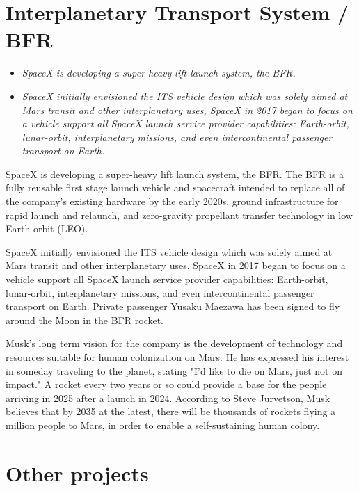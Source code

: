 \section{Interplanetary Transport System /
BFR}\label{interplanetary-transport-system-bfr}

\begin{itemize}
\item
  \emph{SpaceX is developing a super-heavy lift launch system, the BFR.}
\item
  \emph{SpaceX initially envisioned the ITS vehicle design which was
  solely aimed at Mars transit and other interplanetary uses, SpaceX in
  2017 began to focus on a vehicle support all SpaceX launch service
  provider capabilities: Earth-orbit, lunar-orbit, interplanetary
  missions, and even intercontinental passenger transport on Earth.}
\end{itemize}

SpaceX is developing a super-heavy lift launch system, the BFR. The BFR
is a fully reusable first stage launch vehicle and spacecraft intended
to replace all of the company's existing hardware by the early 2020s,
ground infrastructure for rapid launch and relaunch, and zero-gravity
propellant transfer technology in low Earth orbit (LEO).

SpaceX initially envisioned the ITS vehicle design which was solely
aimed at Mars transit and other interplanetary uses, SpaceX in 2017
began to focus on a vehicle support all SpaceX launch service provider
capabilities: Earth-orbit, lunar-orbit, interplanetary missions, and
even intercontinental passenger transport on Earth. Private passenger
Yusaku Maezawa has been signed to fly around the Moon in the BFR rocket.

Musk's long term vision for the company is the development of technology
and resources suitable for human colonization on Mars. He has expressed
his interest in someday traveling to the planet, stating "I'd like to
die on Mars, just not on impact." A rocket every two years or so could
provide a base for the people arriving in 2025 after a launch in 2024.
According to Steve Jurvetson, Musk believes that by 2035 at the latest,
there will be thousands of rockets flying a million people to Mars, in
order to enable a self-sustaining human colony.

\section{Other projects}\label{other-projects}

